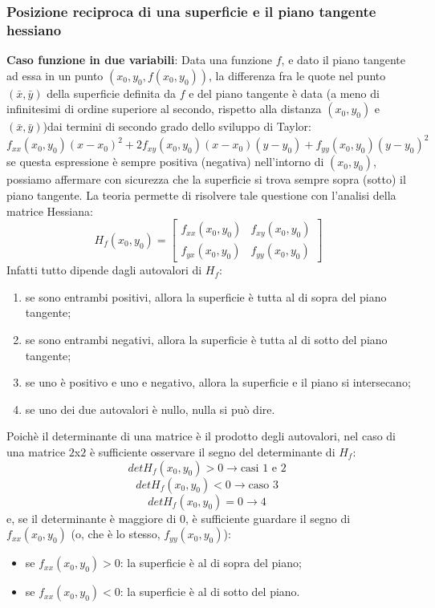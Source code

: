 \subsubsection{Posizione reciproca di una superficie e il piano tangente hessiano}
\textbf{Caso funzione in due variabili}:\newline
\newline
Data una funzione $f$, e dato il piano tangente ad essa in un punto $(x_0, y_0, f(x_0,y_0))$, la differenza fra le quote nel punto $(\bar{x}, \bar{y})$ della superficie definita da $f$ e del piano tangente è data (a meno di infinitesimi di ordine superiore al secondo, rispetto alla distanza $(x_0, y_0)$ e $(\bar{x}, \bar{y})$)dai termini di secondo grado dello sviluppo di Taylor:
\[
    f_{xx}(x_0,y_0)(x-x_0)^2 + 2 f_{xy}(x_0,y_0)(x-x_0)(y-y_0) + f_{yy}(x_0,y_0)(y-y_0)^2
\]
se questa espressione è sempre positiva (negativa) nell'intorno di $(x_0,y_0)$, possiamo affermare con sicurezza che la superficie si trova sempre sopra (sotto) il piano tangente. La teoria permette di risolvere tale questione con l'analisi della matrice Hessiana:
\[
    H_f(x_0,y_0) = \left[\begin{matrix}
        f_{xx}(x_0,y_0) & f_{xy}(x_0,y_0)\\
        f_{yx}(x_0,y_0) & f_{yy}(x_0,y_0)
    \end{matrix}\right]
\]
Infatti tutto dipende dagli autovalori di $H_f$:
\begin{enumerate}
    \item se sono entrambi positivi, allora la superficie è tutta al di sopra del piano tangente;
    \item se sono entrambi negativi, allora la superficie è tutta al di sotto del piano tangente;
    \item se uno è positivo e uno e negativo, allora la superficie e il piano si intersecano;
    \item se uno dei due autovalori è nullo, nulla si può dire.
\end{enumerate}
Poichè il determinante di una matrice è il prodotto degli autovalori, nel caso di una matrice $2$x$2$ è sufficiente osservare il segno del determinante di $H_f$:
\[
    detH_f(x_0,y_0) > 0 \rightarrow  \text{casi 1 e 2}\;
\]
\[
    detH_f(x_0,y_0) < 0 \rightarrow  \text{caso 3}\;
\]
\[
    detH_f(x_0,y_0) = 0 \rightarrow  \text{4}\;
\]
e, se il determinante è maggiore di $0$, è sufficiente guardare il segno di $f_{xx}(x_0,y_0)$ (o, che è lo stesso, $f_{yy}(x_0,y_0)$):
\begin{itemize}
    \item se $f_{xx}(x_0,y_0) > 0$: la superficie è al di sopra del piano;
    \item se $f_{xx}(x_0,y_0) < 0$: la superficie è al di sotto del piano.
\end{itemize}
